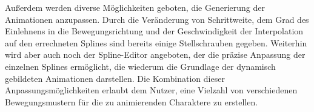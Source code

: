 Außerdem werden diverse Möglichkeiten geboten, die Generierung der Animationen anzupassen. Durch die Veränderung von Schrittweite, dem Grad des Einlehnens in die Bewegungsrichtung und der Geschwindigkeit der Interpolation auf den errechneten Splines sind bereits einige Stellschrauben gegeben. Weiterhin wird aber auch noch der Spline-Editor angeboten, der die präzise Anpassung der einzelnen Splines ermöglicht, die wiederum die Grundlage der dynamisch gebildeten Animationen darstellen. Die Kombination dieser Anpassungsmöglichkeiten erlaubt dem Nutzer, eine Vielzahl von verschiedenen Bewegungsmustern für die zu animierenden Charaktere zu erstellen.


